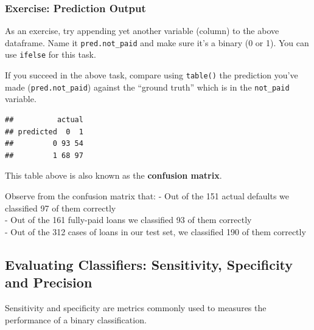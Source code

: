 \documentclass[
]{article}
\newenvironment{Shaded}{\begin{snugshade}}{\end{snugshade}}
\newcommand{\FloatTok}[1]{\textcolor[rgb]{0.00,0.00,0.81}{#1}}
\newcommand{\FunctionTok}[1]{\textcolor[rgb]{0.00,0.00,0.00}{#1}}
\newcommand{\NormalTok}[1]{#1}
\newcommand{\OtherTok}[1]{\textcolor[rgb]{0.56,0.35,0.01}{#1}}
\newcommand{\SpecialCharTok}[1]{\textcolor[rgb]{0.00,0.00,0.00}{#1}}
\newcommand{\StringTok}[1]{\textcolor[rgb]{0.31,0.60,0.02}{#1}}
\begin{document}
\hypertarget{exercise-prediction-output}{%
\subsubsection{Exercise: Prediction
Output}\label{exercise-prediction-output}}

As an exercise, try appending yet another variable (column) to the above
dataframe. Name it \texttt{pred.not\_paid} and make sure it's a binary
(0 or 1). You can use \texttt{ifelse} for this task.

If you succeed in the above task, compare using \texttt{table()} the
prediction you've made (\texttt{pred.not\_paid}) against the ``ground
truth'' which is in the \texttt{not\_paid} variable.

\begin{Shaded}
\end{Shaded}

\begin{verbatim}
##          actual
## predicted  0  1
##         0 93 54
##         1 68 97
\end{verbatim}

This table above is also known as the \textbf{confusion matrix}.

Observe from the confusion matrix that: - Out of the 151 actual defaults
we classified 97 of them correctly\\
- Out of the 161 fully-paid loans we classified 93 of them correctly\\
- Out of the 312 cases of loans in our test set, we classified 190 of
them correctly

\hypertarget{evaluating-classifiers-sensitivity-specificity-and-precision}{%
\subsection{Evaluating Classifiers: Sensitivity, Specificity and
Precision}\label{evaluating-classifiers-sensitivity-specificity-and-precision}}

Sensitivity and specificity are metrics commonly used to measures the
performance of a binary classification.
\end{document}
